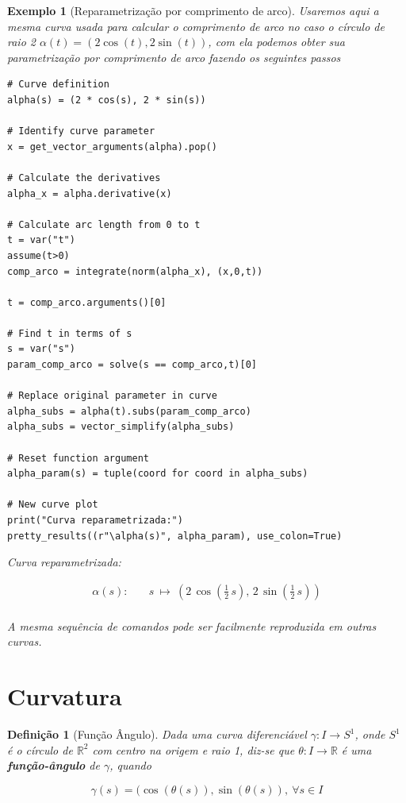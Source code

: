 \documentclass[12pt]{article}
\newtheorem{ex}{Exemplo}[section]
\newtheorem{definition}{Definição}
\begin{document}
\begin{ex}[Reparametrização por comprimento de arco]
Usaremos aqui a mesma curva usada para calcular o comprimento de arco no caso o círculo de raio 2 $\alpha(t) = (2 \cos(t), 2 \sin(t))$, com ela podemos obter sua parametrização por comprimento de arco fazendo os seguintes passos

\begin{lstlisting}
# Curve definition
alpha(s) = (2 * cos(s), 2 * sin(s))

# Identify curve parameter
x = get_vector_arguments(alpha).pop()

# Calculate the derivatives
alpha_x = alpha.derivative(x)
    
# Calculate arc length from 0 to t
t = var("t")
assume(t>0)
comp_arco = integrate(norm(alpha_x), (x,0,t))

t = comp_arco.arguments()[0]
    
# Find t in terms of s
s = var("s")
param_comp_arco = solve(s == comp_arco,t)[0]
    
# Replace original parameter in curve 
alpha_subs = alpha(t).subs(param_comp_arco)
alpha_subs = vector_simplify(alpha_subs)
    
# Reset function argument
alpha_param(s) = tuple(coord for coord in alpha_subs)

# New curve plot
print("Curva reparametrizada:")
pretty_results((r"\alpha(s)", alpha_param), use_colon=True)
\end{lstlisting}

Curva reparametrizada:

\newcommand{\Bold}[1]{\mathbf{#1}}\begin{align*} \alpha(s) :& \quad s \ {\mapsto}\ \left(2 \, \cos\left(\frac{1}{2} \, s\right),\,2 \, \sin\left(\frac{1}{2} \, s\right)\right) \\ \end{align*}

A mesma sequência de comandos pode ser facilmente reproduzida em outras curvas. 
\end{ex}

\section{Curvatura}\label{s4}

\begin{definition}[Função Ângulo]
Dada uma curva diferenciável $\gamma: I \rightarrow S^1$, onde $S^1$ é o círculo de $\mathbb{R}^2$ com centro na origem e raio 1, diz-se que $\theta: I \rightarrow \mathbb{R}$ é uma \textbf{função-ângulo} de $\gamma$, quando

$$\gamma(s) = (\cos(\theta(s)), \sin(\theta(s)),\ \forall s \in I$$
\end{definition}
\end{document}
